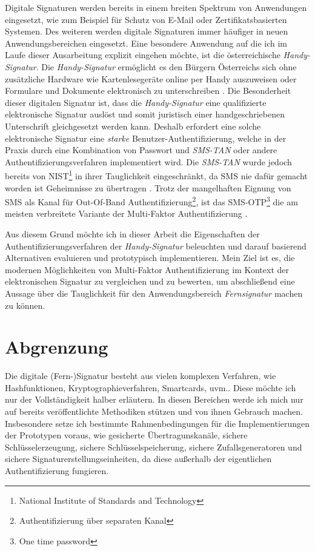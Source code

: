 \documentclass[11pt,a4paper,ngerman]{scrreprt}
\begin{document}
Digitale Signaturen werden bereits in einem breiten Spektrum von Anwendungen eingesetzt, wie zum Beispiel für Schutz von E-Mail oder Zertifikatsbasierten Systemen. Des weiteren werden digitale Signaturen immer häufiger in neuen Anwendungsbereichen eingesetzt. Eine besondere Anwendung auf die ich im Laufe dieser Ausarbeitung explizit eingehen möchte, ist die österreichische \textit{Handy-Signatur}. Die \textit{Handy-Signatur} ermöglicht es den Bürgern Österreichs sich ohne zusätzliche Hardware wie Kartenlesegeräte online per Handy auszuweisen oder Formulare und Dokumente elektronisch zu unterschreiben \cite{handySigOnline}. Die Besonderheit dieser digitalen Signatur ist, dass die \textit{Handy-Signatur} eine qualifizierte elektronische Signatur auslöst und somit juristisch einer handgeschriebenen Unterschrift gleichgesetzt werden kann. Deshalb erfordert eine solche elektronische Signatur eine \emph{starke} Benutzer-Authentifizierung, welche in der Praxis durch eine Kombination von Passwort und \textit{SMS-TAN} oder andere Authentifizierungsverfahren implementiert wird. Die \textit{SMS-TAN} wurde jedoch bereits von NIST\footnote{National Institute of Standards and Technology} in ihrer Tauglichkeit eingeschränkt, da SMS nie dafür gemacht worden ist Geheimnisse zu übertragen \cite{mobileSec,NIST800-63B}. Trotz der mangelhaften Eignung von SMS als Kanal für Out-Of-Band Authentifizierung\footnote{Authentifizierung über separaten Kanal}, ist das SMS-OTP\footnote{One time password} die am meisten verbreitete Variante der Multi-Faktor Authentifizierung \cite[Abb. 3]{fido17}.

Aus diesem Grund möchte ich in dieser Arbeit die Eigenschaften der Authentifizierungsverfahren der \textit{Handy-Signatur} beleuchten und darauf basierend Alternativen evaluieren und prototypisch implementieren. Mein Ziel ist es, die modernen Möglichkeiten von Multi-Faktor Authentifizierung im Kontext der elektronischen Signatur zu vergleichen und zu bewerten, um abschließend eine Aussage über die Tauglichkeit für den Anwendungsbereich \textit{Fernsignatur} machen zu können.

\section*{Abgrenzung}
Die digitale (Fern-)Signatur besteht aus vielen komplexen Verfahren, wie Hashfunktionen, Kryptographieverfahren, Smartcards, uvm.. Diese möchte ich nur der Vollständigkeit halber erläutern. In diesen Bereichen werde ich mich nur auf bereits veröffentlichte Methodiken stützen und von ihnen Gebrauch machen. Insbesondere setze ich bestimmte Rahmenbedingungen für die Implementierungen der Prototypen voraus, wie gesicherte Übertragunskanäle, sichere Schlüsselerzeugung, sichere Schlüsselspeicherung, sichere Zufallsgeneratoren und sichere Signaturerstellungseinheiten, da diese außerhalb der eigentlichen Authentifizierung fungieren.
\clearpage
\end{document}

